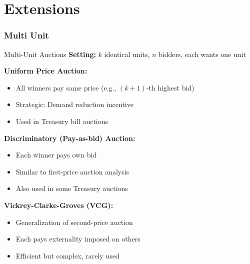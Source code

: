 \documentclass[xcolor={x11names}]{beamer}
\begin{document}
\part{Extensions}

\section{Multi Unit}

\begin{frame}{Multi-Unit Auctions}
\textbf{Setting:} $k$ identical units, $n$ bidders, each wants one unit

\textbf{Uniform Price Auction:}
\begin{itemize}
  \item All winners pay same price (e.g., $(k+1)$-th highest bid)
  \item Strategic: Demand reduction incentive
  \item Used in Treasury bill auctions
\end{itemize}

\textbf{Discriminatory (Pay-as-bid) Auction:}
\begin{itemize}
  \item Each winner pays own bid
  \item Similar to first-price auction analysis
  \item Also used in some Treasury auctions
\end{itemize}

\textbf{Vickrey-Clarke-Groves (VCG):}
\begin{itemize}
  \item Generalization of second-price auction
  \item Each pays externality imposed on others
  \item Efficient but complex, rarely used
\end{itemize}
\end{frame}
\end{document}
